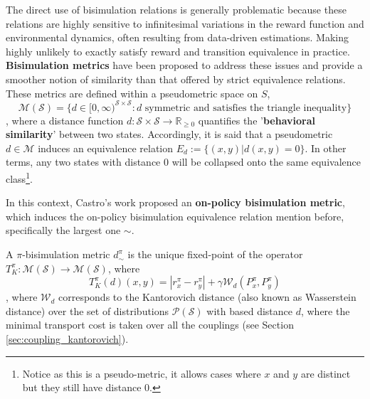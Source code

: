 The direct use of bisimulation relations is generally problematic because these relations are highly sensitive to infinitesimal variations in the reward function and environmental dynamics, often resulting from data-driven estimations. Making highly unlikely to exactly satisfy reward and transition equivalence in practice. \textbf{Bisimulation metrics} \cite{ferns2004metrics, ferns2011bisimulation, ferns2014bisimulation, castro2020scalable} have been proposed to address these issues and provide a smoother notion of similarity than that offered by strict equivalence relations. These metrics are defined within a pseudometric space on $S$, 
\begin{equation}
\mathcal{M(S)}= \{d \in [0, \infty)^{\mathcal{S} \times \mathcal{S}} : d \text{ symmetric and satisfies the triangle inequality}\}
\end{equation}
, where a distance function \(d : \mathcal{S} \times \mathcal{S} \rightarrow \mathbb{R}_{\geq 0}\) quantifies the '\textbf{behavioral similarity}' between two states. Accordingly, it is said that a pseudometric $d \in \mathcal{M}$ induces an equivalence relation $E_d := \{(x, y)|d(x, y) = 0\}$. In other terms, any two states with distance 0 will be collapsed onto the same equivalence class\footnote{Notice as this is a pseudo-metric, it allows cases where $x$ and $y$ are distinct but they still have distance 0.}.

In this context, Castro's work \cite{castro2020scalable} proposed an \textbf{on-policy bisimulation metric}, which induces the on-policy bisimulation equivalence relation mention before, specifically the largest one $\sim$.

\begin{definition}
\label{def:on_policy_bisimulation_metric}
A $\pi$-bisimulation metric $d^\pi_\sim$ is the unique fixed-point of the operator $T^\pi_K : \mathcal{M(S)} \rightarrow \mathcal{M(S)}$, where 
\begin{equation}
    \label{eq:on_policy_bisim_metric}
    T^\pi_K(d)(x, y) = |r^\pi_x - r^\pi_y| + \gamma \mathcal{W}_d(P^\pi_x,P^\pi_y) 
\end{equation}
, where $\mathcal{W}_d$ corresponds to the Kantorovich distance (also known as Wasserstein distance) over the set of distributions $\mathcal{P}(\mathcal{S})$ with based distance $d$, where the minimal transport cost is taken over all the couplings (see Section \ref{sec:coupling_kantorovich}).
\end{definition}


